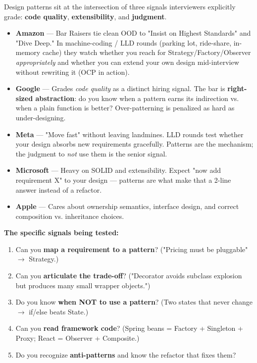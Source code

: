 \documentclass[11pt]{article}
\providecommand{\tightlist}{\setlength{\itemsep}{1pt}\setlength{\parskip}{0pt}}
\begin{document}
Design patterns sit at the intersection of three signals interviewers explicitly grade: \textbf{code quality}, \textbf{extensibility}, and \textbf{judgment}.

\begin{itemize}
\item
  \textbf{Amazon} --- Bar Raisers tie clean OOD to "Insist on Highest Standards" and "Dive Deep." In machine-coding / LLD rounds (parking lot, ride-share, in-memory cache) they watch whether you reach for Strategy/Factory/Observer \emph{appropriately} and whether you can extend your own design mid-interview without rewriting it (OCP in action).
\item
  \textbf{Google} --- Grades \emph{code quality} as a distinct hiring signal. The bar is \textbf{right-sized abstraction}: do you know when a pattern earns its indirection vs. when a plain function is better? Over-patterning is penalized as hard as under-designing.
\item
  \textbf{Meta} --- "Move fast" without leaving landmines. LLD rounds test whether your design absorbs new requirements gracefully. Patterns are the mechanism; the judgment to \emph{not} use them is the senior signal.
\item
  \textbf{Microsoft} --- Heavy on SOLID and extensibility. Expect "now add requirement X" to your design --- patterns are what make that a 2-line answer instead of a refactor.
\item
  \textbf{Apple} --- Cares about ownership semantics, interface design, and correct composition vs. inheritance choices.
\end{itemize}

\textbf{The specific signals being tested:}

\begin{enumerate}
\def\labelenumi{\arabic{enumi}.}
\tightlist
\item
  Can you \textbf{map a requirement to a pattern}? ("Pricing must be pluggable" \(\rightarrow\) Strategy.)
\item
  Can you \textbf{articulate the trade-off}? ("Decorator avoids subclass explosion but produces many small wrapper objects.")
\item
  Do you know \textbf{when NOT to use a pattern}? (Two states that never change \(\rightarrow\) if/else beats State.)
\item
  Can you \textbf{read framework code}? (Spring beans = Factory + Singleton + Proxy; React = Observer + Composite.)
\item
  Do you recognize \textbf{anti-patterns} and know the refactor that fixes them?
\end{enumerate}
\end{document}
